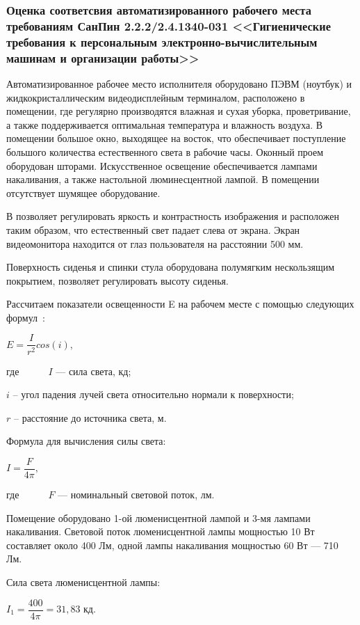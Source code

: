 \subsubsection{Оценка соответсвия автоматизированного рабочего места требованиям СанПин 2.2.2/2.4.1340-031 <<Гигиенические требования к персональным электронно-вычислительным машинам и организации работы>>}

Автоматизированное рабочее место исполнителя оборудовано ПЭВМ (ноутбук) и жидкокристаллическим 
видеодисплейным терминалом, расположено в помещении, где регулярно производятся влажная 
и сухая уборка, проветривание, а также поддерживается
оптимальная температура и влажность воздуха. В помещении большое окно, выходящее на восток,
что обеспечивает поступление большого количества естественного света в рабочие часы.
Оконный проем оборудован шторами. Искусственное освещение обеспечивается лампами
накаливания, а также настольной люминесцентной лампой. В помещении отсутствует шумящее оборудование.

В позволяет регулировать яркость и контрастность изображения и расположен таким образом, что 
естественный свет падает слева от экрана. Экран видеомонитора 
находится от глаз пользователя на расстоянии 500 мм.

Поверхность сиденья и спинки стула оборудована полумягким нескользящим покрытием, позволяет регулировать
высоту сиденья.


Рассчитаем показатели освещенности E на рабочем месте с помощью следующих формул~\cite{gost_8995}:
\begin{center}
$E = \dfrac{I}{r^{2}}cos(i),$
\end{center}
где~~~~~\ $\textit{I}$ --- сила света, кд;

$\textit{i}$ -- угол падения лучей света относительно нормали к поверхности;

$\textit{r}$ -- расстояние до источника света, м.

Формула для вычисления силы света:
\begin{center}
$I = \dfrac{F}{4\pi},$
\end{center}
где~~~~~\ $\textit{F}$ --- номинальный световой поток, лм.

Помещение оборудовано 1-ой люменисцентной лампой и 3-мя лампами накаливания. 
Световой поток люменисцентной лампы мощностью 10 Вт составляет около 400 Лм, 
одной лампы накаливания мощностью 60 Вт --- 710 Лм.

Сила света люменисцентной лампы:
\begin{center}
$I_{1} = \dfrac{400}{4\pi}= 31,83$ кд.
\end{center}

